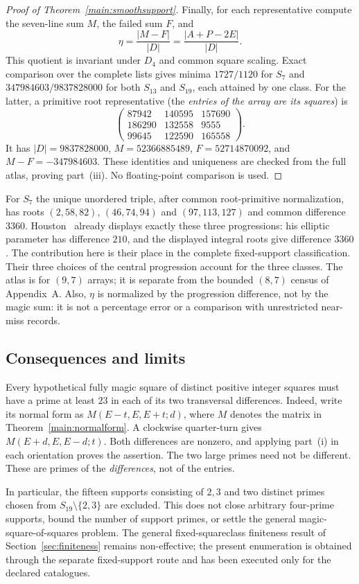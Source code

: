 \begin{proof}[Proof of Theorem~\ref{main:smoothsupport}]
Finally, for each representative compute the seven-line sum $M$, the
failed sum $F$, and
\[
\eta=\frac{|M-F|}{|D|}=\frac{|A+P-2E|}{|D|}.
\]
This quotient is invariant under $D_4$ and common square scaling. Exact
comparison over the complete lists gives minima
$1727/1120$ for $S_7$ and $347984603/9837828000$ for both $S_{13}$ and
$S_{19}$, each attained by one class. For the latter, a primitive root
representative (the \emph{entries of the array are its squares}) is
\[
\begin{pmatrix}
87942&140595&157690\\
186290&132558&9555\\
99645&122590&165558
\end{pmatrix}.
\]
It has $|D|=9837828000$, $M=52366885489$, $F=52714870092$, and
$M-F=-347984603$. These identities and uniqueness are checked from the
full atlas, proving part~(iii). No floating-point comparison is used.
\end{proof}

For $S_7$ the unique unordered triple, after common root-primitive
normalization, has roots $(2,58,82)$, $(46,74,94)$ and $(97,113,127)$ and common
difference $3360$. Houston~\cite{HOU16B} already displays exactly these
three progressions: his elliptic parameter has difference $210$, and the
displayed integral roots give difference $3360$. The contribution here is
their place in the complete fixed-support classification. Their three choices of the central progression account
for the three classes. The atlas is for $(9,7)$ arrays; it is separate
from the bounded $(8,7)$ census of Appendix~A. Also, $\eta$ is normalized
by the progression difference, not by the magic sum: it is not a percentage
error or a comparison with unrestricted near-miss records.

\subsection{Consequences and limits}

Every hypothetical fully magic square of distinct positive integer
squares must have a prime at least $23$ in each of its two transversal
differences. Indeed, write its normal form as
$M(E-t,E,E+t;d)$, where $M$ denotes the matrix in
Theorem~\ref{main:normalform}. A clockwise quarter-turn gives
$M(E+d,E,E-d;t)$. Both differences are nonzero, and applying part~(i) in
each orientation proves the assertion. The two large primes need not be
different. These are primes of the \emph{differences}, not of the entries.

In particular, the fifteen supports consisting of $2,3$ and two distinct
primes chosen from $S_{19}\setminus\{2,3\}$ are excluded. This does not close arbitrary
four-prime supports, bound the number of support primes, or settle the
general magic-square-of-squares problem. The general fixed-squareclass
finiteness result of Section~\ref{sec:finiteness} remains non-effective;
the present enumeration is obtained through the separate fixed-support
route and has been executed only for the declared catalogues.
